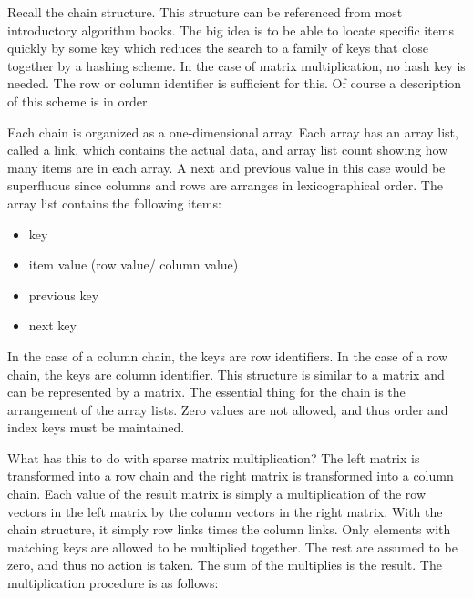 Recall the chain structure.  This structure can be referenced from most introductory algorithm books.  The big idea is to be able to locate specific items quickly by some key which reduces the search to a family of keys that close together by a hashing scheme.  In the case of matrix multiplication, no hash key is needed.  The row or column identifier is sufficient for this.  Of course a description of this scheme is in order.  

Each chain is organized as a one-dimensional array.  Each array has an array list, called a link, which contains the actual data, and array list count showing how many items are in each array.  A next and previous value in this case would be superfluous since columns and rows are arranges in lexicographical order.  The array list contains the following items:
\begin{itemize}
\item key
\item item value (row value/ column value)
\item previous key
\item next key 
\end{itemize}

In the case of a column chain, the keys are row identifiers.   In the case of a row chain, the keys are column identifier.  This structure is similar to a matrix and can be represented by a matrix.  The essential thing for the chain is the arrangement of the array lists.  Zero values are not allowed, and thus order and index keys must be maintained.  

What has this to do with sparse matrix multiplication?  The left matrix is transformed into a row chain and the right matrix is transformed into a column chain.  Each value of the result matrix is simply a multiplication of the row vectors in the left matrix by the column vectors in the right matrix.  With the chain structure, it simply row links times the column links.  Only elements with matching keys are allowed to be multiplied together.  The rest are assumed to be zero, and thus no action is taken.  The sum of the multiplies is the result.  The multiplication procedure is as follows:

